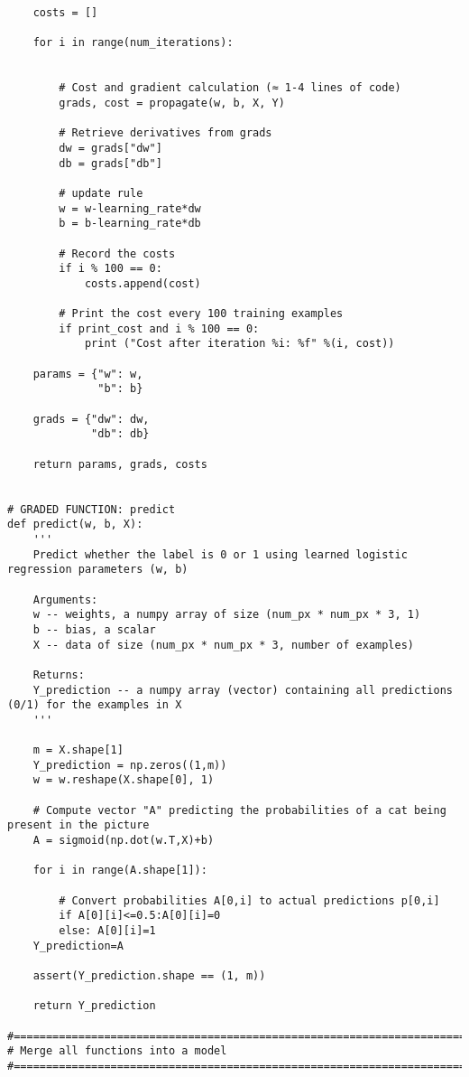 \begin{verbatim}
    costs = []
    
    for i in range(num_iterations):
        
        
        # Cost and gradient calculation (≈ 1-4 lines of code)
        grads, cost = propagate(w, b, X, Y)
        
        # Retrieve derivatives from grads
        dw = grads["dw"]
        db = grads["db"]
        
        # update rule
        w = w-learning_rate*dw
        b = b-learning_rate*db
        
        # Record the costs
        if i % 100 == 0:
            costs.append(cost)
        
        # Print the cost every 100 training examples
        if print_cost and i % 100 == 0:
            print ("Cost after iteration %i: %f" %(i, cost))
    
    params = {"w": w,
              "b": b}
    
    grads = {"dw": dw,
             "db": db}
    
    return params, grads, costs


# GRADED FUNCTION: predict
def predict(w, b, X):
    '''
    Predict whether the label is 0 or 1 using learned logistic regression parameters (w, b)
    
    Arguments:
    w -- weights, a numpy array of size (num_px * num_px * 3, 1)
    b -- bias, a scalar
    X -- data of size (num_px * num_px * 3, number of examples)
    
    Returns:
    Y_prediction -- a numpy array (vector) containing all predictions (0/1) for the examples in X
    '''
    
    m = X.shape[1]
    Y_prediction = np.zeros((1,m))
    w = w.reshape(X.shape[0], 1)
    
    # Compute vector "A" predicting the probabilities of a cat being present in the picture
    A = sigmoid(np.dot(w.T,X)+b)
    
    for i in range(A.shape[1]):
        
        # Convert probabilities A[0,i] to actual predictions p[0,i]
        if A[0][i]<=0.5:A[0][i]=0
        else: A[0][i]=1
    Y_prediction=A
    
    assert(Y_prediction.shape == (1, m))
    
    return Y_prediction

#==============================================================================
# Merge all functions into a model
#==============================================================================


\end{verbatim}
